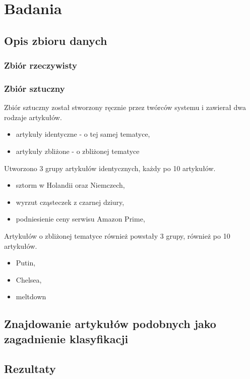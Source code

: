 \section{Badania}

\subsection{Opis zbioru danych}

\subsubsection{Zbiór rzeczywisty}

\subsubsection{Zbiór sztuczny}

Zbiór sztuczny został stworzony ręcznie przez twórców systemu i zawierał dwa rodzaje
artykułów. 
\begin{itemize}
\item artykuły identyczne - o tej samej tematyce,
\item artykuły zbliżone - o zbliżonej tematyce
\end{itemize}

Utworzono 3 grupy artykułów identycznych, każdy po 10 artykułów.
\begin{itemize}
\item sztorm w Holandii oraz Niemczech,
\item wyrzut cząsteczek z czarnej dziury,
\item podniesienie ceny serwisu Amazon Prime,
\end{itemize}

Artykułów o zbliżonej tematyce również powstały 3 grupy, również po 10 artykułów.
\begin{itemize}
\item Putin,
\item Chelsea,
\item meltdown
\end{itemize}

\subsection{Znajdowanie artykułów podobnych jako zagadnienie klasyfikacji}

\subsection{Rezultaty}